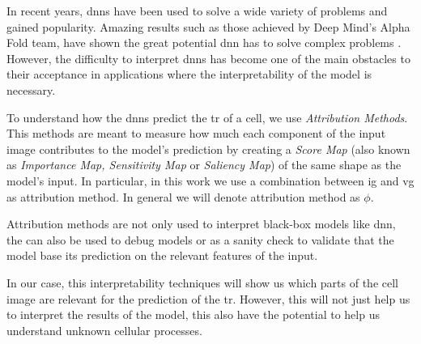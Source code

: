 \glsresetall
In recent years, \glspl{dnn} have been used to solve a wide variety of problems and gained popularity. Amazing results such as those achieved by Deep Mind's Alpha Fold team, have shown the great potential \gls{dnn} has to solve complex problems \cite{AlphaFold}. However, the difficulty to interpret \glspl{dnn} has become one of the main obstacles to their acceptance in applications where the interpretability of the model is necessary.

To understand how the \glspl{dnn} predict the \gls{tr} of a cell, we use \textit{Attribution Methods}. This methods are meant to measure how much each component of the input image contributes to the model's prediction by creating a \textit{Score Map} (also known as \textit{Importance Map, Sensitivity Map} or \textit{Saliency Map}) of the same shape as the model's input. In particular, in this work we use a combination between \gls{ig} \cite{sundararajan2017axiomatic} and \gls{vg} \cite{adebayo2020sanity} as attribution method. In general we will denote attribution method as $\phi$.

Attribution methods are not only used to interpret black-box models like \gls{dnn}, the can also be used to debug models or as a sanity check to validate that the model base its prediction on the relevant features of the input.

In our case, this interpretability techniques will show us which parts of the cell image are relevant for the prediction of the \gls{tr}. However, this will not just help us to interpret the results of the model, this also have the potential to help us understand unknown cellular processes.
